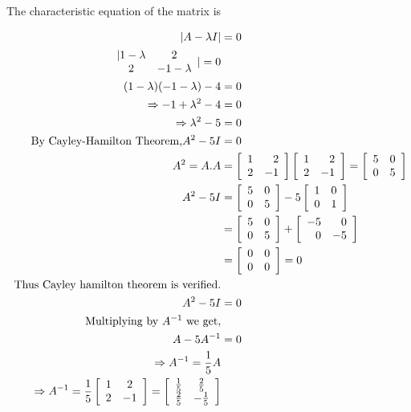 \begin{answer}
 The characteristic equation of the matrix is 

\begin{align*}
	| A-\lambda I|&=0\\
	\begin{array}{cc}|1-\lambda & 2 \\ 2 & -1-\lambda\end{array}|=0\\
	(1-\lambda)(-1-\lambda)-4&=0\\ \Rightarrow-1+\lambda^{2}-4&=0 \\\Rightarrow \lambda^{2}-5&=0\\
	\newline\text{By Cayley-Hamilton Theorem,} A^{2}-5 I&=0\\
	A^{2}=A . A &=\left[\begin{array}{rr}1 & 2 \\ 2 & -1\end{array}\right]\left[\begin{array}{rr}1 & 2 \\ 2 & -1\end{array}\right]=\left[\begin{array}{cc}5 & 0 \\ 0 & 5\end{array}\right] \\A^{2}-5 I&=\left[\begin{array}{ll}5 & 0 \\ 0 & 5\end{array}\right]-5\left[\begin{array}{ll}1 & 0 \\ 0 & 1\end{array}\right]\\&=\left[\begin{array}{ll}5 & 0 \\ 0 & 5\end{array}\right]+\left[\begin{array}{rr}-5 & 0 \\ 0 & -5\end{array}\right]\\&=\left[\begin{array}{ll}0 & 0 \\ 0 & 0\end{array}\right]=0 \\
	\text{ Thus Cayley hamilton theorem is verified.}\\
	A^{2}-5 I&=0\\\text{Multiplying by}\ A^{-1} \ \text{we get},\\
	A-5 A^{-1}&=0 \\\Rightarrow A^{-1}=\frac{1}{5} A \\\Rightarrow A^{-1}=\frac{1}{5}\left[\begin{array}{cc}
		1 & 2 \\
		2 & -1
	\end{array}\right]=\left[\begin{array}{cc}
		\frac{1}{5} & \frac{2}{5} \\
		\frac{2}{5} & -\frac{1}{5}
	\end{array}\right]
\end{align*}


\end{answer}
